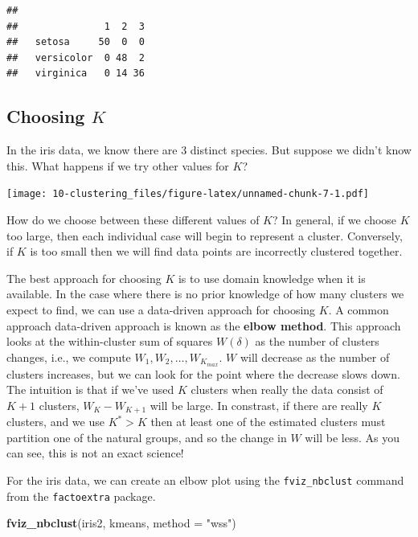 \documentclass[
]{book}
\newenvironment{Shaded}{\begin{snugshade}}{\end{snugshade}}
\newcommand{\AttributeTok}[1]{\textcolor[rgb]{0.13,0.29,0.53}{#1}}
\newcommand{\FunctionTok}[1]{\textcolor[rgb]{0.13,0.29,0.53}{\textbf{#1}}}
\newcommand{\NormalTok}[1]{#1}
\newcommand{\StringTok}[1]{\textcolor[rgb]{0.31,0.60,0.02}{#1}}
\theoremstyle{definition}
\theoremstyle{definition}
\theoremstyle{definition}
\theoremstyle{definition}
\theoremstyle{remark}
\begin{document}
\begin{verbatim}
##             
##               1  2  3
##   setosa     50  0  0
##   versicolor  0 48  2
##   virginica   0 14 36
\end{verbatim}

\subsection{\texorpdfstring{Choosing \(K\)}{Choosing K}}\label{choosing-k}

In the iris data, we know there are 3 distinct species. But suppose we didn't know this. What happens if we try other values for \(K\)?

\texttt{[image: 10-clustering\_files/figure-latex/unnamed-chunk-7-1.pdf]}

How do we choose between these different values of \(K\)?
In general, if we choose \(K\) too large, then each individual case will begin to represent a cluster. Conversely, if \(K\) is too small then we will find data points are incorrectly clustered together.

The best approach for choosing \(K\) is to use domain knowledge when it is available. In the case where there is no prior knowledge of how many clusters we expect to find, we can use a data-driven approach for choosing \(K\).
A common approach data-driven approach is known as the \textbf{elbow method}. This approach looks at the within-cluster sum of squares \(W(\delta)\) as the number of clusters changes, i.e., we compute \(W_1, W_2, \ldots, W_{K_{max}}\). \(W\) will decrease as the number of clusters increases, but we can look for the point where the decrease slows down. The intuition is that if we've used \(K\) clusters when really the data consist of \(K+1\) clusters, \(W_K-W_{K+1}\) will be large. In constrast, if there are really \(K\) clusters, and we use \(K^*>K\) then at least one of the estimated clusters must partition one of the natural groups, and so the change in \(W\) will be less. As you can see, this is not an exact science!

For the iris data, we can create an elbow plot using the \texttt{fviz\_nbclust} command from the \texttt{factoextra} package.

\begin{Shaded}
\begin{Highlighting}[]
\FunctionTok{fviz\_nbclust}\NormalTok{(iris2, kmeans, }\AttributeTok{method =} \StringTok{"wss"}\NormalTok{)}
\end{Highlighting}
\end{Shaded}
\end{document}
